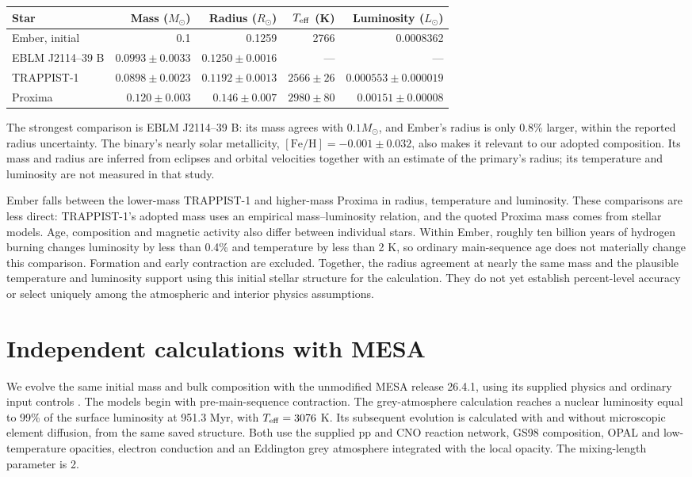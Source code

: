 \documentclass[11pt,letterpaper]{article}
\newcommand{\Ms}{M_\odot}\newcommand{\Rs}{R_\odot}\newcommand{\Ls}{L_\odot}
\begin{document}
\begin{center}\small\begin{tabular}{@{}lrrrr@{}}\toprule
Star & Mass ($\Ms$) & Radius ($\Rs$) & $T_{\rm eff}$ (K) & Luminosity ($\Ls$) \\\midrule
Ember, initial & 0.1 & 0.1259 & 2766 & 0.0008362 \\
EBLM J2114--39 B & $0.0993\pm0.0033$ & $0.1250\pm0.0016$ & --- & --- \\
TRAPPIST-1 & $0.0898\pm0.0023$ & $0.1192\pm0.0013$ & $2566\pm26$ & $0.000553\pm0.000019$ \\
Proxima & $0.120\pm0.003$ & $0.146\pm0.007$ & $2980\pm80$ & $0.00151\pm0.00008$ \\\bottomrule
\end{tabular}\end{center}

The strongest comparison is EBLM J2114--39 B: its mass agrees with $0.1\Ms$,
and Ember's radius is only 0.8\% larger, within the reported radius uncertainty.
The binary's nearly solar metallicity, $[\mathrm{Fe/H}]=-0.001\pm0.032$,
also makes it relevant to our adopted composition. Its mass and radius are
inferred from eclipses and orbital velocities together with an estimate of the
primary's radius; its temperature and luminosity are not measured in that study.

Ember falls between the lower-mass TRAPPIST-1 and higher-mass Proxima in
radius, temperature and luminosity. These comparisons are less direct:
TRAPPIST-1's adopted mass uses an empirical mass--luminosity relation, and the
quoted Proxima mass comes from stellar models. Age, composition and magnetic
activity also differ between individual stars. Within Ember, roughly ten
billion years of hydrogen burning changes luminosity by less than 0.4\% and
temperature by less than 2 K, so ordinary main-sequence age does not materially
change this comparison. Formation and early contraction are excluded.
Together, the radius agreement at nearly the same mass and the plausible
temperature and luminosity support using this initial stellar structure for
the calculation. They do not yet establish percent-level accuracy or select
uniquely among the atmospheric and interior physics assumptions.

\section{Independent calculations with MESA}
We evolve the same initial mass and bulk composition with the unmodified
MESA release 26.4.1, using its supplied physics and ordinary input controls
\cite{jermyn23}. The models begin with pre-main-sequence contraction. The
grey-atmosphere calculation reaches a nuclear luminosity equal to 99\% of
the surface luminosity at 951.3 Myr, with $T_{\rm eff}=3076$ K.
Its subsequent evolution is calculated with and without microscopic
element diffusion, from the same saved structure. Both use the supplied pp
and CNO reaction network, GS98 composition, OPAL and low-temperature
opacities, electron conduction and an Eddington grey atmosphere integrated
with the local opacity. The mixing-length parameter is 2.
\end{document}
